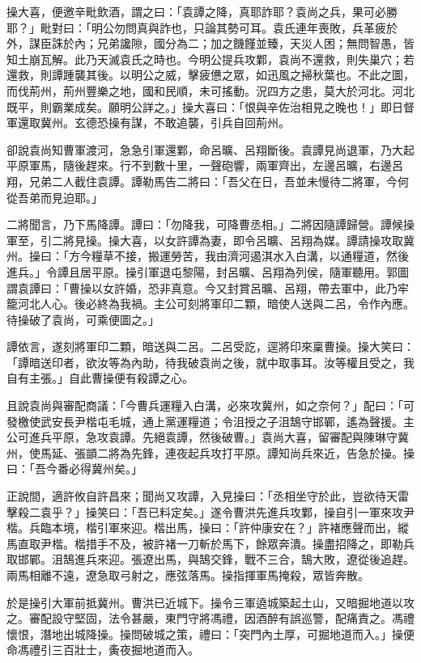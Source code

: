 操大喜，便邀辛毗飲酒，謂之曰：「袁譚之降，真耶詐耶？袁尚之兵，果可必勝耶？」毗對曰：「明公勿問真與詐也，只論其勢可耳。袁氏連年喪敗，兵革疲於外，謀臣誅於內；兄弟讒隙，國分為二；加之饑饉並臻，天災人困；無問智愚，皆知土崩瓦解。此乃天滅袁氏之時也。今明公提兵攻鄴，袁尚不還救，則失巢穴；若還救，則譚踵襲其後。以明公之威，擊疲憊之眾，如迅風之掃秋葉也。不此之圖，而伐荊州，荊州豐樂之地，國和民順，未可搖動。況四方之患，莫大於河北。河北既平，則霸業成矣。願明公詳之。」操大喜曰：「恨與辛佐治相見之晚也！」即日督軍還取冀州。玄德恐操有謀，不敢追襲，引兵自回荊州。

卻說袁尚知曹軍渡河，急急引軍還鄴，命呂曠、呂翔斷後。袁譚見尚退軍，乃大起平原軍馬，隨後趕來。行不到數十里，一聲砲響，兩軍齊出，左邊呂曠，右邊呂翔，兄弟二人截住袁譚。譚勒馬告二將曰：「吾父在日，吾並未慢待二將軍，今何從吾弟而見迫耶。」

二將聞言，乃下馬降譚。譚曰：「勿降我，可降曹丞相。」二將因隨譚歸營。譚候操軍至，引二將見操。操大喜，以女許譚為妻，即令呂曠、呂翔為媒。譚請操攻取冀州。操曰：「方今糧草不接，搬運勞苦，我由濟河遏淇水入白溝，以通糧道，然後進兵。」令譚且居平原。操引軍退屯黎陽，封呂曠、呂翔為列侯，隨軍聽用。郭圖謂袁譚曰：「曹操以女許婚，恐非真意。今又封賞呂曠、呂翔，帶去軍中，此乃牢籠河北人心。後必終為我禍。主公可刻將軍印二顆，暗使人送與二呂，令作內應。待操破了袁尚，可乘便圖之。」

譚依言，遂刻將軍印二顆，暗送與二呂。二呂受訖，逕將印來稟曹操。操大笑曰：「譚暗送印者，欲汝等為內助，待我破袁尚之後，就中取事耳。汝等權且受之，我自有主張。」自此曹操便有殺譚之心。

且說袁尚與審配商議：「今曹兵運糧入白溝，必來攻冀州，如之奈何？」配曰：「可發檄使武安長尹楷屯毛城，通上黨運糧道；令沮授之子沮鵠守邯鄲，遙為聲援。主公可進兵平原，急攻袁譚。先絕袁譚，然後破曹。」袁尚大喜，留審配與陳琳守冀州，使馬延、張顗二將為先鋒，連夜起兵攻打平原。譚知尚兵來近，告急於操。操曰：「吾今番必得冀州矣。」

正說間，適許攸自許昌來；聞尚又攻譚，入見操曰：「丞相坐守於此，豈欲待天雷擊殺二袁乎？」操笑曰：「吾已料定矣。」遂令曹洪先進兵攻鄴，操自引一軍來攻尹楷。兵臨本境，楷引軍來迎。楷出馬，操曰：「許仲康安在？」許褚應聲而出，縱馬直取尹楷。楷措手不及，被許褚一刀斬於馬下，餘眾奔潰。操盡招降之，即勒兵取邯鄲。沮鵠進兵來迎。張遼出馬，與鵠交鋒，戰不三合，鵠大敗，遼從後追趕。兩馬相離不遠，遼急取弓射之，應弦落馬。操指揮軍馬掩殺，眾皆奔散。

於是操引大軍前抵冀州。曹洪已近城下。操令三軍遶城築起土山，又暗掘地道以攻之。審配設守堅固，法令甚嚴，東門守將馮禮，因酒醉有誤巡警，配痛責之。馮禮懷恨，潛地出城降操。操問破城之策，禮曰：「突門內土厚，可掘地道而入。」操便命馮禮引三百壯士，夤夜掘地道而入。

